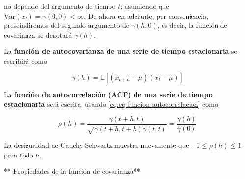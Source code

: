 \documentclass[12pt,]{krantz}
\theoremstyle{definition}
\theoremstyle{definition}
\theoremstyle{definition}
\theoremstyle{remark}
\let\BeginKnitrBlock\begin \let\EndKnitrBlock\end
\begin{document}
no depende del argumento de tiempo \(t\); asumiendo que
\(\text{Var}(x_t)=\gamma(0,0)<\infty\). De ahora en adelante, por
conveniencia, prescindiremos del segundo argumento de \(\gamma(h,0)\),
es decir, la función de covarianza se denotará \(\gamma(h)\).

\BeginKnitrBlock{definition}
\protect\hypertarget{def:defi-autocovarianza-serie-estacionaria}{}{\label{def:defi-autocovarianza-serie-estacionaria}
}La \textbf{función de autocovarianza de una serie de tiempo
estacionaria} se escribirá como

\begin{equation}
\gamma(h)=\mathbb{E}[(x_{t+h}-\mu)(x_t-\mu)]
\label{eq:eq-funcion-autocovarianza-estacionaria}
\end{equation}
\EndKnitrBlock{definition}

\BeginKnitrBlock{definition}
\protect\hypertarget{def:defi-acf-estacionaria}{}{\label{def:defi-acf-estacionaria}
}La \textbf{función de autocorrelación (ACF) de una serie de tiempo
estacionaria} será escrita, usando \eqref{eq:eq-funcion-autocorrelacion}
como

\begin{equation}
\rho(h)=\frac{\gamma(t+h,t)}{\sqrt{\gamma(t+h,t+h)\gamma(t,t)}}=\frac{\gamma(h)}{\gamma(0)}
\label{eq:eq-funcion-autocorrelacion-estacionaria}
\end{equation}
\EndKnitrBlock{definition}

La desigualdad de Cauchy-Schwartz muestra nuevamente que
\(-1\leq\rho(h)\leq1\) para todo \(h\).

** Propiedades de la función de covarianza**
\end{document}
